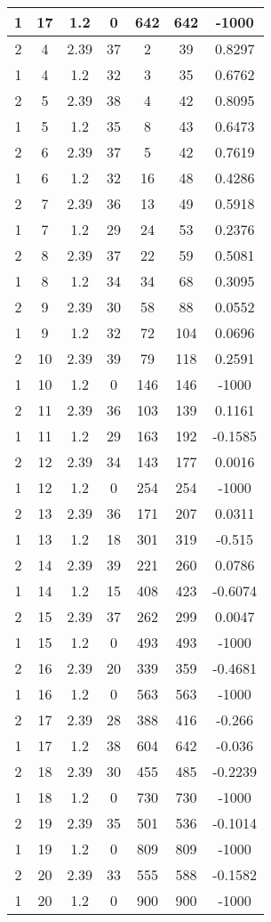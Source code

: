 \documentclass[letterpaper, 12pt]{article}
\begin{document}
\begin{longtable}{|c|c|c|c|c|c|c|}
\hline
1 & 17 & 1.2 & 0 & 642 & 642 & -1000 \\
\hline
2 & 4 & 2.39 & 37 & 2 & 39 & 0.8297 \\
\hline
1 & 4 & 1.2 & 32 & 3 & 35 & 0.6762 \\
\hline
2 & 5 & 2.39 & 38 & 4 & 42 & 0.8095 \\
\hline
1 & 5 & 1.2 & 35 & 8 & 43 & 0.6473 \\
\hline
2 & 6 & 2.39 & 37 & 5 & 42 & 0.7619 \\
\hline
1 & 6 & 1.2 & 32 & 16 & 48 & 0.4286 \\
\hline
2 & 7 & 2.39 & 36 & 13 & 49 & 0.5918 \\
\hline
1 & 7 & 1.2 & 29 & 24 & 53 & 0.2376 \\
\hline
2 & 8 & 2.39 & 37 & 22 & 59 & 0.5081 \\
\hline
1 & 8 & 1.2 & 34 & 34 & 68 & 0.3095 \\
\hline
2 & 9 & 2.39 & 30 & 58 & 88 & 0.0552 \\
\hline
1 & 9 & 1.2 & 32 & 72 & 104 & 0.0696 \\
\hline
2 & 10 & 2.39 & 39 & 79 & 118 & 0.2591 \\
\hline
1 & 10 & 1.2 & 0 & 146 & 146 & -1000 \\
\hline
2 & 11 & 2.39 & 36 & 103 & 139 & 0.1161 \\
\hline
1 & 11 & 1.2 & 29 & 163 & 192 & -0.1585 \\
\hline
2 & 12 & 2.39 & 34 & 143 & 177 & 0.0016 \\
\hline
1 & 12 & 1.2 & 0 & 254 & 254 & -1000 \\
\hline
2 & 13 & 2.39 & 36 & 171 & 207 & 0.0311 \\
\hline
1 & 13 & 1.2 & 18 & 301 & 319 & -0.515 \\
\hline
2 & 14 & 2.39 & 39 & 221 & 260 & 0.0786 \\
\hline
1 & 14 & 1.2 & 15 & 408 & 423 & -0.6074 \\
\hline
2 & 15 & 2.39 & 37 & 262 & 299 & 0.0047 \\
\hline
1 & 15 & 1.2 & 0 & 493 & 493 & -1000 \\
\hline
2 & 16 & 2.39 & 20 & 339 & 359 & -0.4681 \\
\hline
1 & 16 & 1.2 & 0 & 563 & 563 & -1000 \\
\hline
2 & 17 & 2.39 & 28 & 388 & 416 & -0.266 \\
\hline
1 & 17 & 1.2 & 38 & 604 & 642 & -0.036 \\
\hline
2 & 18 & 2.39 & 30 & 455 & 485 & -0.2239 \\
\hline
1 & 18 & 1.2 & 0 & 730 & 730 & -1000 \\
\hline
2 & 19 & 2.39 & 35 & 501 & 536 & -0.1014 \\
\hline
1 & 19 & 1.2 & 0 & 809 & 809 & -1000 \\
\hline
2 & 20 & 2.39 & 33 & 555 & 588 & -0.1582 \\
\hline
1 & 20 & 1.2 & 0 & 900 & 900 & -1000 \\
\hline
\end{longtable}
\end{document}
